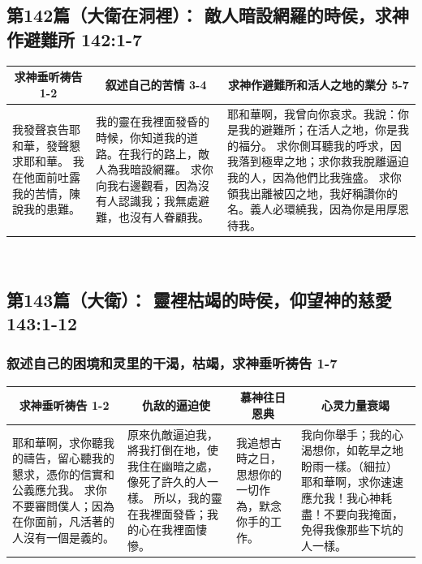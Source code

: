 \subsection{第142篇（大衛在洞裡）： 敵人暗設網羅的時侯，求神作避難所 142:1-7}
\begin{table}[H]
\centering
\begin{tabular}{p{3.2cm}|p{5.5cm}|p{8.00cm}}\hline\hline
\multicolumn{1}{c|}{求神垂听祷告 1-2}&\multicolumn{1}{c|}{叙述自己的苦情 3-4}&\multicolumn{1}{c}{求神作避難所和活人之地的業分 5-7}\\\hline
我發聲哀告耶和華，發聲懇求耶和華。
我在他面前吐露我的苦情，陳說我的患難。
&我的靈在我裡面發昏的時候，你知道我的道路。在我行的路上，敵人為我暗設網羅。
求你向我右邊觀看，因為沒有人認識我；我無處避難，也沒有人眷顧我。
&耶和華啊，我曾向你哀求。我說：你是我的避難所；在活人之地，你是我的福分。
求你側耳聽我的呼求，因我落到極卑之地；求你救我脫離逼迫我的人，因為他們比我強盛。
求你領我出離被囚之地，我好稱讚你的名。義人必環繞我，因為你是用厚恩待我。\\\hline
\end{tabular}
\end{table} 


\subsection{第143篇（大衛）： 靈裡枯竭的時侯，仰望神的慈愛 143:1-12}
\subsubsection{叙述自己的困境和灵里的干渴，枯竭，求神垂听祷告 1-7}
\begin{table}[H]
\centering
\begin{tabular}{p{}|p{4.00cm}|p{2.00cm}|p{5.00cm}}\hline\hline
\multicolumn{1}{c|}{求神垂听祷告 1-2}&\multicolumn{1}{c|}{仇敌的逼迫使}&\multicolumn{1}{c|}{慕神往日恩典}&\multicolumn{1}{c}{心灵力量衰竭}\\\hline
耶和華啊，求你聽我的禱告，留心聽我的懇求，憑你的信實和公義應允我。
求你不要審問僕人；因為在你面前，凡活著的人沒有一個是義的。
&原來仇敵逼迫我，將我打倒在地，使我住在幽暗之處，像死了許久的人一樣。
所以，我的靈在我裡面發昏；我的心在我裡面悽慘。
&我追想古時之日，思想你的一切作為，默念你手的工作。
&我向你舉手；我的心渴想你，如乾旱之地盼雨一樣。（細拉）
耶和華啊，求你速速應允我！我心神耗盡！不要向我掩面，免得我像那些下坑的人一樣。\\\hline
\end{tabular}
\end{table} 


